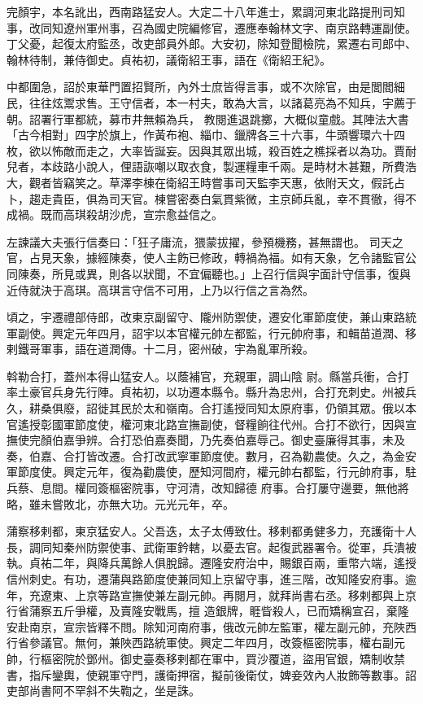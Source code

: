 \begin{pinyinscope}
 完顏宇，本名訛出，西南路猛安人。大定二十八年進士，累調河東北路提刑司知事，改同知遼州軍州事，召為國史院編修官，遷應奉翰林文字、南京路轉運副使。丁父憂，起復太府監丞，改吏部員外郎。大安初，除知登聞檢院，累遷右司郎中、翰林待制，兼侍御史。貞祐初，議衛紹王事，語在《衛紹王紀》。



 中都圍急，詔於東華門置招賢所，內外士庶皆得言事，或不次除官，由是閭閻細民，往往炫鬻求售。王守信者，本一村夫，敢為大言，以諸葛亮為不知兵，宇薦于朝。詔署行軍都統，募市井無賴為兵，
 教閱進退跳擲，大概似童戲。其陣法大書「古今相對」四字於旗上，作黃布袍、緇巾、鑞牌各三十六事，牛頭響環六十四枚，欲以怖敵而走之，大率皆誕妄。因與其眾出城，殺百姓之樵採者以為功。賈耐兒者，本歧路小說人，俚語詼嘲以取衣食，製運糧車千兩。是時材木甚艱，所費浩大，觀者皆竊笑之。草澤李棟在衛紹王時嘗事司天監李天惠，依附天文，假託占卜，趨走貴臣，俱為司天官。棟嘗密奏白氣貫紫微，主京師兵亂，幸不貫徹，得不成禍。既而高琪殺胡沙虎，宣宗愈益信之。



 左諫議大夫張行信奏曰：「狂子庸流，猥蒙拔擢，參預機務，甚無謂也。
 司天之官，占見天象，據經陳奏，使人主飭已修政，轉禍為福。如有天象，乞令諸監官公同陳奏，所見或異，則各以狀聞，不宜偏聽也。」上召行信與宇面計守信事，復與近侍就決于高琪。高琪言守信不可用，上乃以行信之言為然。



 頃之，宇遷禮部侍郎，改東京副留守、隴州防禦使，遷安化軍節度使，兼山東路統軍副使。興定元年四月，詔宇以本官權元帥左都監，行元帥府事，和輯苗道潤、移剌鐵哥軍事，語在道潤傳。十二月，密州破，宇為亂軍所殺。



 斡勒合打，蓋州本得山猛安人。以蔭補官，充親軍，調山陰
 尉。縣當兵衝，合打率土豪官兵身先行陣。貞祐初，以功遷本縣令。縣升為忠州，合打充刺史。州被兵久，耕桑俱廢，詔徙其民於太和嶺南。合打遙授同知太原府事，仍領其眾。俄以本官遙授彰國軍節度使，權河東北路宣撫副使，督糧餉往代州。合打不欲行，因與宣撫使完顏伯嘉爭辨。合打恐伯嘉奏聞，乃先奏伯嘉辱己。御史臺廉得其事，未及奏，伯嘉、合打皆改遷。合打改武寧軍節度使。數月，召為勸農使。久之，為金安軍節度使。興定元年，復為勸農使，歷知河間府，權元帥右都監，行元帥府事，駐兵蔡、息間。權同簽樞密院事，守河清，改知歸德
 府事。合打屢守邊要，無他將略，雖未嘗敗北，亦無大功。元光元年，卒。



 蒲察移剌都，東京猛安人。父吾迭，太子太傅致仕。移剌都勇健多力，充護衛十人長，調同知秦州防禦使事、武衛軍鈐轄，以憂去官。起復武器署令。從軍，兵潰被執。貞祐二年，與降兵萬餘人俱脫歸。遷隆安府治中，賜銀百兩，重幣六端，遙授信州刺史。有功，遷蒲與路節度使兼同知上京留守事，進三階，改知隆安府事。逾年，充遼東、上京等路宣撫使兼左副元帥。再閱月，就拜尚書右丞。移剌都與上京行省蒲察五斤爭權，及賣隆安戰馬，擅
 造銀牌，睚眥殺人，已而矯稱宣召，棄隆安赴南京，宣宗皆釋不問。除知河南府事，俄改元帥左監軍，權左副元帥，充陜西行省參議官。無何，兼陜西路統軍使。興定二年四月，改簽樞密院事，權右副元帥，行樞密院於鄧州。御史臺奏移剌都在軍中，買沙覆道，盜用官銀，矯制收禁書，指斥鑾輿，使親軍守門，護衛押宿，擬前後衛仗，婢妾效內人妝飾等數事。詔吏部尚書阿不罕斜不失鞫之，坐是誅。




\end{pinyinscope}
